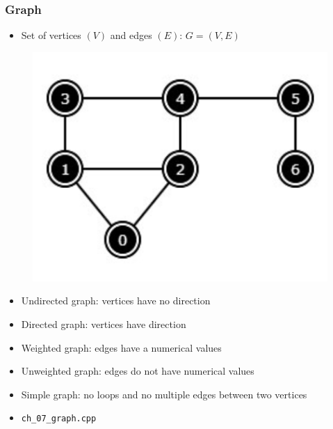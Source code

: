 \documentclass{beamer}
\begin{document}
\begin{frame}[fragile]
\frametitle{Graph}
	\begin{itemize}
		\item Set of vertices $(V)$ and edges $(E)$: $G = (V, E)$
	\end{itemize}
	\begin{figure}
		\centering
		\includegraphics[scale=0.3]{imgs/2.4/graph/graph.png}
	\end{figure}
	\begin{itemize}
		\item Undirected graph: vertices have no direction
		\item Directed graph: vertices have direction
		\item Weighted graph: edges have a numerical values
		\item Unweighted graph: edges do not have numerical values
		\item Simple graph: no loops and no multiple edges between two vertices	
		\item \color{red}\verb|ch_07_graph.cpp|\color{black}
	\end{itemize}
\end{frame}
\end{document}
